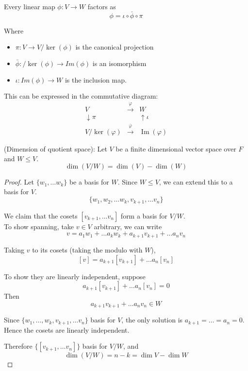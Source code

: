 \begin{corollary}
    Every linear map $\phi: V \to W$ factors as 
    \[
        \phi = \iota \circ \bar{ \phi}  \circ \pi
    \]

    Where 
    \begin{itemize}
        \item $ \pi: V \to V / \ker(\phi)$ is the canonical projection 
        \item $ \bar{ \phi}: /\ker( \phi) \to Im( \phi) $ is an isomorphism 
        \item $\iota: Im( \phi) \to W$ is the inclusion map.
    \end{itemize} 
    
    This can be expressed in the commutative diagram:
    \[
    \begin{array}{ccc}
    V & \xrightarrow{\varphi} & W \\
    \downarrow \pi & & \uparrow \iota \\
    V / \ker(\varphi) & \xrightarrow{\overline{\varphi}} & \operatorname{Im}(\varphi)
    \end{array}
    \]
\end{corollary}

\begin{proposition}
    (Dimension of quotient space): Let $V$ be a finite dimensional vector space over $F$ and $W \leq V$. 
    \[
        \dim ( V /W) = \dim (V) - \dim (W)
    \]
\end{proposition}

\begin{proof}
    Let $ \{ w_1, \hdots w_k\} $ be a basis for $W$. Since $W \leq V$, we can extend this to a basis for $V$. 
    \[
    \{ w_1, w_2, \hdots w_k, v_{k + 1}, \hdots v_n \} 
    \]

    We claim that the cosets $ \left[ v_{k + 1}, \hdots v_n\right] $ form a basis for $V / W$. \\

    To show spanning, take $v \in V$ arbitrary, we can write 
    \[
        v = a_1 w_1 + \hdots a_k w_k + a_{k + 1}v_{k + 1} + \hdots a_n v_n
    \]

    Taking $v$ to its cosets (taking the modulo with $W$), 
    \[
    \left[ v \right]  = a_{k + 1} \left[ v_{k + 1} \right]  + \hdots a_n \left[ v_n \right] 
    \]

    To show they are linearly independent, suppose 
    \[
        a_{k + 1} \left[ v_{k + 1} \right]  + \hdots a_n \left[ v_n \right]  = 0
    \]
    Then 
    \[a_{k + 1}v_{k + 1} + \hdots a_n v_n \in W
    \]

    Since $ \{ w_1,\hdots, w_k, v_{k + 1}, \hdots v_n \} $ basis for $V$, the only solution is $a_{k + 1} = \hdots = a_n = 0$. Hence the cosets are linearly independent. 

    Therefore $ \{  [v_{k + 1}, \hdots v_n] \}$ basis for $V / W$, and 
    \[
        \dim (V / W) = n - k = \dim V - \dim W
    \]
\end{proof}


